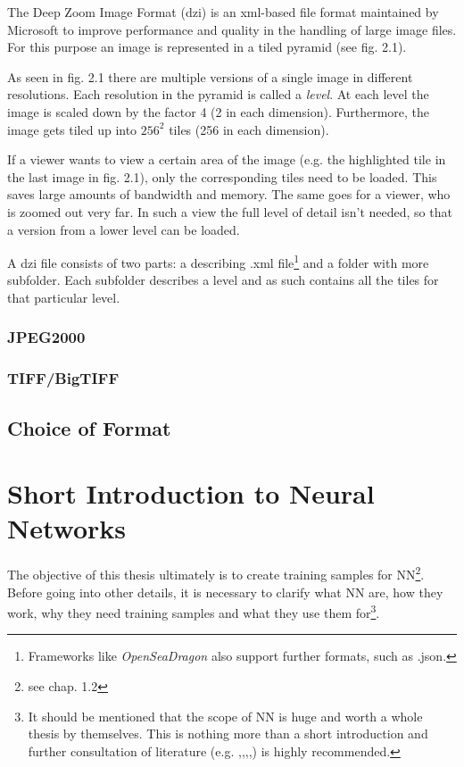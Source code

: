 The Deep Zoom Image Format (dzi) is an xml-based file format maintained by Microsoft to improve performance and quality in the handling of large image files. For this purpose an image is represented in a tiled pyramid (see fig. 2.1).

As seen in fig. 2.1 there are multiple versions of a single image in different resolutions. Each resolution in the pyramid is called a \emph{level}. At each level the image is scaled down by the factor 4 (2 in each dimension). Furthermore, the image gets tiled up into $256^2$ tiles (256 in each dimension)\cite{web:dzi}.

If a viewer wants to view a certain area of the image (e.g. the highlighted tile in the last image in fig. 2.1), only the corresponding tiles need to be loaded. This saves large amounts of bandwidth and memory. The same goes for a viewer, who is zoomed out very far. In such a view the full level of detail isn't needed, so that a version from a lower level can be loaded.

A dzi file consists of two parts: a describing .xml file\footnote{Frameworks like \emph{OpenSeaDragon} also support further formats, such as .json.} and a folder with more subfolder. Each subfolder describes a level and as such contains all the tiles for that particular level.


\subsubsection{JPEG2000}


\subsubsection{TIFF/BigTIFF}


\subsection{Choice of Format}


\section{Short Introduction to Neural Networks}
The objective of this thesis ultimately is to create training samples for NN\footnote{see chap. 1.2}. Before going into other details, it is necessary to clarify what NN are, how they work, why they need training samples and what they use them for\footnote{It should be mentioned that the scope of NN is huge and worth a whole thesis by themselves. This is nothing more than a short introduction and further consultation of literature (e.g. \cite{Stergiou96},\cite{Bourg04},\cite{Egmont-Petersen02},\cite{Kriesel07},\cite{Shiffman12}) is highly recommended.}.

